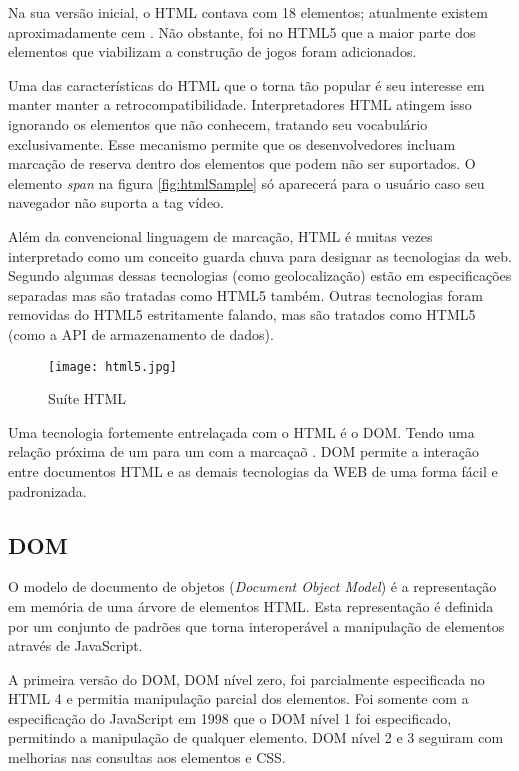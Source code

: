 Na sua versão inicial, o HTML contava com 18 elementos; atualmente
existem aproximadamente cem \autocite{diveIntohtml}. Não obstante, foi
no HTML5 que a maior parte dos elementos que viabilizam a construção
de jogos foram adicionados.

Uma das características do HTML que o torna tão popular é seu
interesse em manter manter a retrocompatibilidade. Interpretadores
HTML atingem isso ignorando os elementos que não conhecem, tratando
seu vocabulário exclusivamente. Esse mecanismo permite que os
desenvolvedores incluam marcação de reserva dentro dos elementos
que podem não ser suportados. O elemento \textit{span} na figura
\ref{fig:htmlSample} só aparecerá para o usuário caso seu navegador
não suporta a tag vídeo.

Além da convencional linguagem de marcação, HTML é muitas vezes
interpretado como um conceito guarda chuva para designar as tecnologias
da web. Segundo \autocite{diveIntohtml} algumas dessas tecnologias (como geolocalização) estão em especificações separadas mas são tratadas como HTML5 também. Outras
tecnologias foram removidas do HTML5 estritamente falando, mas são tratados
como HTML5 (como a API de armazenamento de dados).

\begin{figure}
    \centering
    \texttt{[image: html5.jpg]}
    \caption{Suíte HTML}
\end{figure}

Uma tecnologia fortemente entrelaçada com o HTML é o DOM. Tendo uma relação próxima de um para um com a marcaçaõ \autocite{howBrowsersWork}. DOM permite a interação entre documentos HTML e as demais tecnologias da WEB de uma forma fácil e padronizada.

\subsection{DOM}

O modelo de documento de objetos (\textit{Document Object Model}) é
a representação em memória de uma árvore de elementos HTML. Esta
representação é definida por um conjunto de padrões que torna
interoperável a manipulação de elementos através de JavaScript.

A primeira versão do DOM, DOM nível zero, foi parcialmente
especificada no HTML 4 e permitia manipulação parcial dos elementos.
Foi somente com a especificação do JavaScript em 1998 que o DOM nível
1 foi especificado, permitindo a manipulação de qualquer elemento. DOM
nível 2 e 3 seguiram com melhorias nas consultas aos elementos e CSS.

